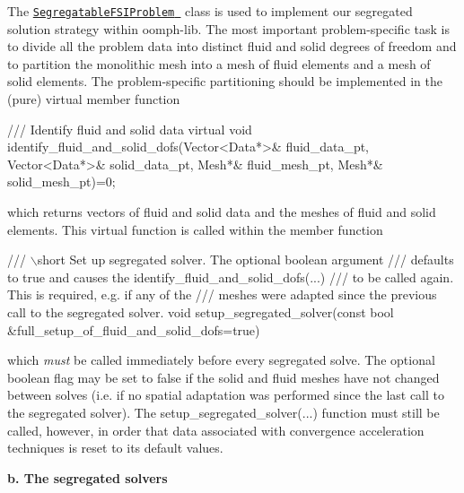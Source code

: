The \href{../../../the_data_structure/html/classoomph_1_1SegregatableFSIProblem.html}{\tt {\ttfamily Segregatable\+F\+S\+I\+Problem} } class is used to implement our segregated solution strategy within {\ttfamily oomph-\/lib}. The most important problem-\/specific task is to divide all the problem data into distinct fluid and solid degrees of freedom and to partition the monolithic mesh into a mesh of fluid elements and a mesh of solid elements. The problem-\/specific partitioning should be implemented in the (pure) virtual member function 
\begin{DoxyCode}
\textcolor{comment}{/// Identify fluid and solid data}
\textcolor{comment}{}\textcolor{keyword}{virtual} \textcolor{keywordtype}{void} identify\_fluid\_and\_solid\_dofs(Vector<Data*>& fluid\_data\_pt,
                                           Vector<Data*>& solid\_data\_pt,
                                           Mesh*& fluid\_mesh\_pt,
                                           Mesh*& solid\_mesh\_pt)=0;
\end{DoxyCode}
 which returns vectors of fluid and solid data and the meshes of fluid and solid elements. This virtual function is called within the member function 
\begin{DoxyCode}
\textcolor{comment}{/// \(\backslash\)short Set up segregated solver. The optional boolean argument}
\textcolor{comment}{}\textcolor{comment}{/// defaults to true and causes the identify\_fluid\_and\_solid\_dofs(...)}
\textcolor{comment}{}\textcolor{comment}{/// to be called again. This is required, e.g. if any of the}
\textcolor{comment}{}\textcolor{comment}{/// meshes were adapted since the previous call to the segregated solver.}
\textcolor{comment}{}\textcolor{keywordtype}{void} setup\_segregated\_solver(\textcolor{keyword}{const} \textcolor{keywordtype}{bool} &full\_setup\_of\_fluid\_and\_solid\_dofs=\textcolor{keyword}{true})
\end{DoxyCode}
 which {\itshape must} be called immediately before every segregated solve. The optional boolean flag may be set to {\ttfamily false} if the solid and fluid meshes have not changed between solves (i.\+e. if no spatial adaptation was performed since the last call to the segregated solver). The {\ttfamily setup\+\_\+segregated\+\_\+solver}(...) function must still be called, however, in order that data associated with convergence acceleration techniques is reset to its default values.

{\bfseries b. The segregated solvers}

